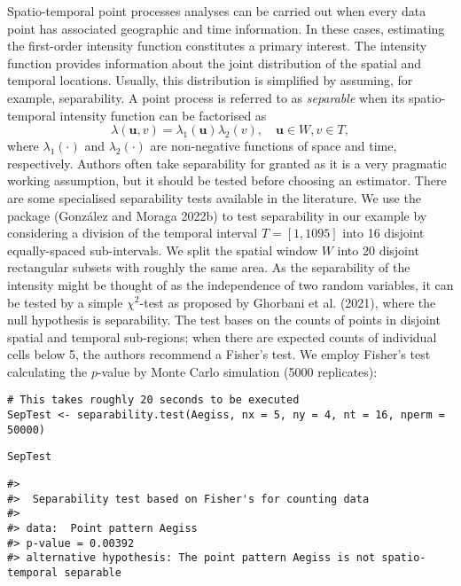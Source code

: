 Spatio-temporal point processes analyses can be carried out when every data point has associated geographic and time information. In these cases, estimating the first-order intensity function constitutes a primary interest. The intensity function provides information about the joint distribution of the spatial and temporal locations. Usually, this distribution is simplified by assuming, for example, separability. A point process is referred to as \textit{separable} when its spatio-temporal intensity function can be factorised as
\[
    \lambda(\mathbf{u},v) = \lambda_1(\mathbf{u}) \lambda_2(v), \quad  \mathbf{u} \in W,v \in T,
\]
where \(\lambda_1(\cdot)\) and \(\lambda_2(\cdot)\) are non-negative functions of space and time, respectively. Authors often take separability for granted as it is a very pragmatic working assumption, but it should be tested before choosing an estimator. There are some specialised separability tests available in the literature. We use the package  (González and Moraga 2022b) to test separability in our example by considering a division of the temporal interval \(T=[1,1095]\) into 16 disjoint equally-spaced sub-intervals. We split the spatial window \(W\) into 20 disjoint rectangular subsets with roughly the same area. As the separability of the intensity might be thought of as the independence of two random variables, it can be tested by a simple \(\chi^2\)-test as proposed by Ghorbani et al. (2021), where the null hypothesis is separability. The test bases on the counts of points in disjoint spatial and temporal sub-regions; when there are expected counts of individual cells below 5, the authors recommend a Fisher's test. We employ Fisher's test calculating the \(p\)-value by Monte Carlo simulation (5000 replicates):

\begin{verbatim}
# This takes roughly 20 seconds to be executed 
SepTest <- separability.test(Aegiss, nx = 5, ny = 4, nt = 16, nperm = 50000)
\end{verbatim}

\begin{verbatim}
SepTest
\end{verbatim}

\begin{verbatim}
#> 
#>  Separability test based on Fisher's for counting data
#> 
#> data:  Point pattern Aegiss
#> p-value = 0.00392
#> alternative hypothesis: The point pattern Aegiss is not spatio-temporal separable
\end{verbatim}

